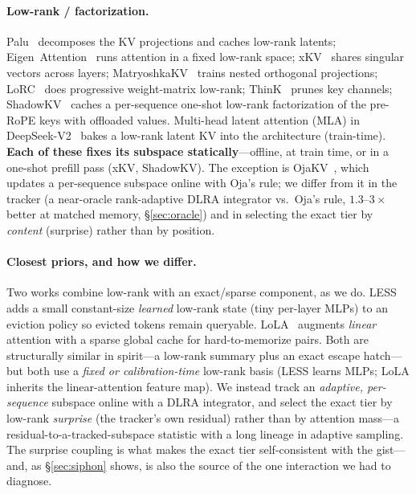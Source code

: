 \documentclass[11pt]{article}
\begin{document}
\paragraph{Low-rank / factorization.} Palu~\citep{chang2025palu} decomposes the
KV projections and caches low-rank latents; Eigen~Attention~\citep{saxena2024eigen}
runs attention in a fixed low-rank space; xKV~\citep{chang2025xkv} shares
singular vectors across layers; MatryoshkaKV~\citep{lin2025matryoshkakv} trains
nested orthogonal projections; LoRC~\citep{zhang2024lorc} does progressive
weight-matrix low-rank; ThinK~\citep{xu2024think} prunes key channels;
ShadowKV~\citep{sun2024shadowkv} caches a per-sequence one-shot low-rank
factorization of the pre-RoPE keys with offloaded values.
Multi-head latent attention (MLA) in DeepSeek-V2~\citep{deepseekv2} bakes a
low-rank latent KV into the architecture (train-time). \textbf{Each of these
fixes its subspace statically}---offline, at train time, or in a one-shot prefill
pass (xKV, ShadowKV). The exception is OjaKV~\citep{zhu2025ojakv}, which updates a
per-sequence subspace online with Oja's rule; we differ from it in the tracker (a
near-oracle rank-adaptive DLRA integrator vs.\ Oja's rule, $1.3$--$3\times$ better
at matched memory, \S\ref{sec:oracle}) and in selecting the exact tier by
\emph{content} (surprise) rather than by position.

\paragraph{Closest priors, and how we differ.} Two works combine low-rank with an
exact/sparse component, as we do. LESS~\citep{dong2024less} adds a small
constant-size \emph{learned} low-rank state (tiny per-layer MLPs) to an eviction
policy so evicted tokens remain queryable. LoLA~\citep{mcdermott2025lola}
augments \emph{linear} attention with a sparse global cache for hard-to-memorize
pairs. Both are structurally similar in spirit---a low-rank summary plus an exact
escape hatch---but both use a \emph{fixed or calibration-time} low-rank basis
(LESS learns MLPs; LoLA inherits the linear-attention feature map). We instead
track an \emph{adaptive, per-sequence} subspace online with a DLRA integrator,
and select the exact tier by low-rank \emph{surprise} (the tracker's own
residual) rather than by attention mass---a residual-to-a-tracked-subspace
statistic with a long lineage in adaptive sampling. The surprise coupling is what
makes the exact tier self-consistent with the gist---and, as \S\ref{sec:siphon}
shows, is also the source of the one interaction we had to diagnose.
\end{document}
